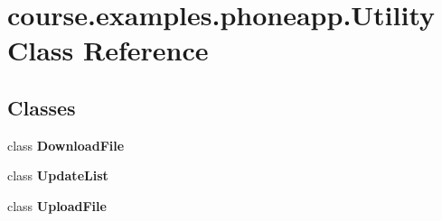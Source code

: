 \hypertarget{classcourse_1_1examples_1_1phoneapp_1_1_utility}{}\section{course.\+examples.\+phoneapp.\+Utility Class Reference}
\label{classcourse_1_1examples_1_1phoneapp_1_1_utility}
\subsection*{Classes}
\begin{DoxyCompactItemize}
\item 
class {\bfseries Download\+File}
\item 
class {\bfseries Update\+List}
\item 
class {\bfseries Upload\+File}
\end{DoxyCompactItemize}
